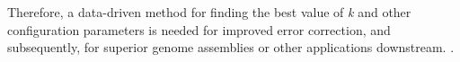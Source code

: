 Therefore, a data-driven  method for finding the best value of \textit{k} and other configuration parameters is needed for improved error correction, and subsequently, for superior genome assemblies or other applications downstream. .









